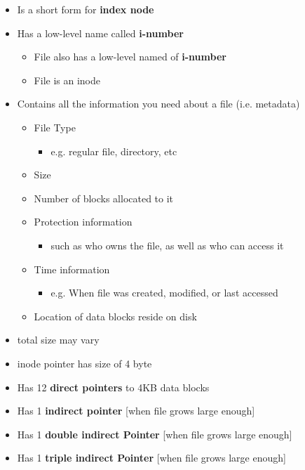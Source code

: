 \documentclass[12pt]{article}
\begin{document}
\begin{itemize}
    \item Is a short form for \textbf{index node}
    \item Has a low-level name called \textbf{i-number}
    \begin{itemize}
        \item File also has a low-level named of \textbf{i-number}
        \item File is an inode
    \end{itemize}
    \item Contains all the information you need about a file (i.e. metadata)

    \begin{itemize}
        \item File Type
        \begin{itemize}
            \item e.g. regular file, directory, etc
        \end{itemize}
        \item Size
        \item Number of blocks allocated to it
        \item Protection information
        \begin{itemize}
            \item such as who owns the file, as well as who can access it
        \end{itemize}
        \item Time information
        \begin{itemize}
            \item e.g. When file was created, modified, or last accessed
        \end{itemize}
        \item Location of data blocks reside on disk
    \end{itemize}

    \item total size may vary
    \item inode pointer has size of 4 byte
    \item Has 12 \textbf{direct pointers} to 4KB data blocks
    \item Has 1 \textbf{indirect pointer} [when file grows large enough]
    \item Has 1 \textbf{double indirect Pointer} [when file grows large enough]
    \item Has 1 \textbf{triple indirect Pointer} [when file grows large enough]


\end{itemize}
\end{document}
